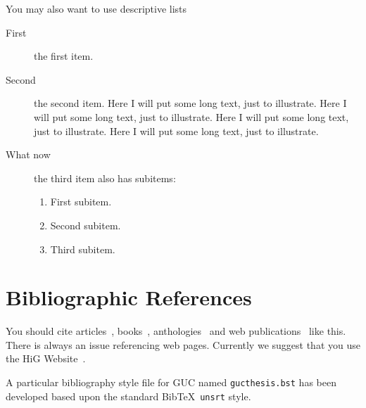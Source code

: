 You may also want to use descriptive lists
\begin{description}
	\item[First] the first item.
	\item[Second] the second item. Here I will put some long text, just to illustrate.
	  Here I will put some long text, just to illustrate. Here I will put
	  some long text, just to illustrate. Here I will put some long text,
	  just to illustrate.
	\item [What now] the third item also has subitems:
	  \begin{enumerate}
		  \item First subitem.
		  \item Second subitem.
		  \item Third subitem.
	  \end{enumerate}
\end{description}


\section{Bibliographic References}

You should cite articles~\cite{Askvall1985}, books~\cite{Card1983},
anthologies~\cite{Lancaster1985} and web publications~\cite{Meldon1997}
like this. There is always an issue referencing web pages. Currently
we suggest that you use the HiG Website~\cite{HiG:Website}.


A particular bibliography style file for GUC named
\texttt{gucthesis.bst} has been developed based upon the
standard Bib\TeX\ \texttt{unsrt} style.
